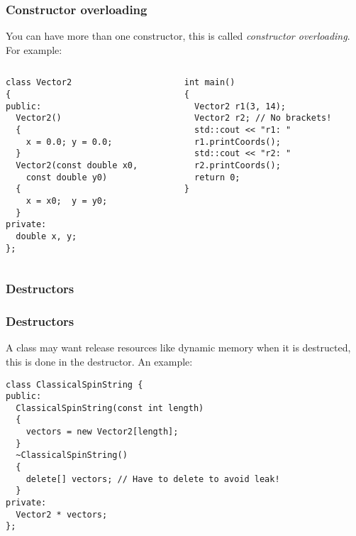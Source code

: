 \documentclass{beamer}
\begin{document}
\begin{frame}[fragile]
  \frametitle{Constructor overloading}
  
  You can have more than one constructor, this is called \textit{constructor overloading}.  For example:
  \begin{columns}[t]
    \begin{column}[T]{0.5\linewidth}
      \begin{lstlisting}[aboveskip=0pt,belowskip=0pt]
class Vector2
{
public:
  Vector2()
  {
    x = 0.0; y = 0.0;
  }
  Vector2(const double x0,
    const double y0)
  {
    x = x0;  y = y0;
  }
private:
  double x, y;
};  
  \end{lstlisting}
    \end{column}
    \begin{column}[T]{0.5\linewidth}
      \begin{lstlisting}[aboveskip=0pt,belowskip=0pt]
int main()
{
  Vector2 r1(3, 14);
  Vector2 r2; // No brackets!
  std::cout << "r1: "
  r1.printCoords();
  std::cout << "r2: "
  r2.printCoords();
  return 0;
}
      \end{lstlisting}
    \end{column}
  \end{columns}  

\end{frame}


\subsubsection{Destructors}

\begin{frame}[fragile]
  \frametitle{Destructors}
  
	A class may want release resources like dynamic memory when it is destructed, this is done in the destructor.
  \pause
  An example:
  \begin{lstlisting}[basicstyle=\ttfamily\fontsize{8}{9}\selectfont{},belowskip=0pt]
class ClassicalSpinString {
public:
  ClassicalSpinString(const int length)
  {
    vectors = new Vector2[length];
  }
  ~ClassicalSpinString()
  {
    delete[] vectors; // Have to delete to avoid leak!
  }
private:
  Vector2 * vectors;
};  
  \end{lstlisting}
  
  
\end{frame}
\end{document}
